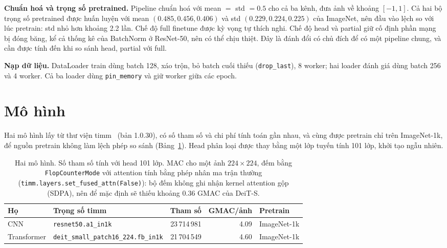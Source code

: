 
\textbf{Chuẩn hoá và trọng số pretrained.} Pipeline chuẩn hoá với mean \(=\) std \(=0.5\) cho cả ba kênh, đưa ảnh về khoảng \([-1,1]\). Cả hai bộ trọng số pretrained được huấn luyện với mean \((0.485, 0.456, 0.406)\) và std \((0.229, 0.224, 0.225)\) của ImageNet, nên đầu vào lệch so với lúc pretrain: std nhỏ hơn khoảng 2.2 lần. Chế độ full finetune được kỳ vọng tự thích nghi. Chế độ head và partial giữ cố định phần mạng bị đóng băng, kể cả thống kê của BatchNorm ở ResNet-50, nên có thể chịu thiệt. Đây là đánh đổi có chủ đích để có một pipeline chung, và cần được tính đến khi so sánh head, partial với full.

\textbf{Nạp dữ liệu.} DataLoader train dùng batch 128, xáo trộn, bỏ batch cuối thiếu (\texttt{drop\_last}), 8 worker; hai loader đánh giá dùng batch 256 và 4 worker. Cả ba loader dùng \texttt{pin\_memory} và giữ worker giữa các epoch.

\section{Mô hình}\label{sec:a1-models}
Hai mô hình lấy từ thư viện timm~\cite{wightman2019timm} (bản 1.0.30), có số tham số và chi phí tính toán gần nhau, và cùng được pretrain chỉ trên ImageNet-1k, để nguồn pretrain không làm lệch phép so sánh (Bảng~\ref{tab:a1-models}). Head phân loại được thay bằng một lớp tuyến tính 101 lớp, khởi tạo ngẫu nhiên.

\begin{table}[htbp]
\centering
\caption{Hai mô hình. Số tham số tính với head 101 lớp. MAC cho một ảnh \(224\times224\), đếm bằng \texttt{FlopCounterMode} với attention tính bằng phép nhân ma trận thường (\texttt{timm.layers.set\_fused\_attn(False)}): bộ đếm không ghi nhận kernel attention gộp (SDPA), nên để mặc định sẽ thiếu khoảng 0.36 GMAC của DeiT-S.}
\label{tab:a1-models}
\small
\begin{adjustbox}{max width=\linewidth}
\begin{tabular}{llrrl}
\toprule
Họ & Trọng số timm & Tham số & GMAC/ảnh & Pretrain \\
\midrule
CNN & \texttt{resnet50.a1\_in1k} & 23\,714\,981 & 4.09 & ImageNet-1k \\
Transformer & \texttt{deit\_small\_patch16\_224.fb\_in1k} & 21\,704\,549 & 4.60 & ImageNet-1k \\
\bottomrule
\end{tabular}
\end{adjustbox}
\end{table}

